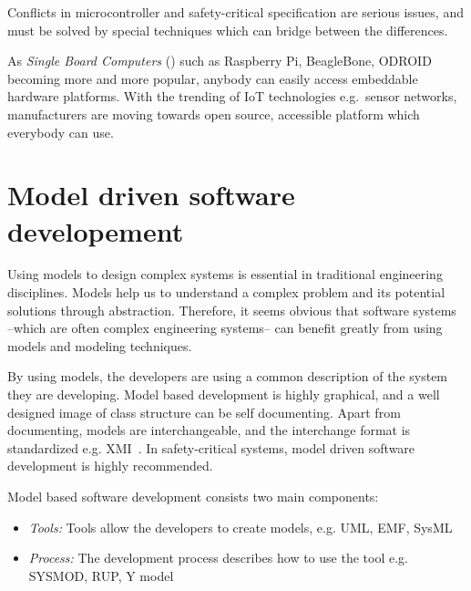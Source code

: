Conflicts in microcontroller and safety-critical specification are serious issues, and must be solved by special techniques which can bridge between the differences.

As \emph{Single Board Computers} () such as Raspberry Pi, BeagleBone, ODROID becoming more and more popular, anybody can easily access embeddable hardware platforms. With the trending of IoT technologies e.g.\ sensor networks, manufacturers are moving towards open source, accessible platform which everybody can use.

\section{Model driven software developement}

Using models to design complex systems is essential in traditional engineering disciplines. Models help us to understand a complex problem and its potential solutions through abstraction. Therefore, it seems obvious that software systems --which are often complex engineering systems-- can benefit greatly from using models and modeling techniques. \citep{pastor2008model}

By using models, the developers are using a common description of the system they are developing. Model based development is highly graphical, and a well designed image of class structure can be self documenting. Apart from documenting, models are interchangeable, and the interchange format is standardized e.g. XMI~\cite{XMI}. In safety-critical systems, model driven software development is highly recommended.

Model based software development consists two main components:
\begin{itemize}
	\item \emph{Tools:} Tools allow the developers to create models, e.g. UML, EMF, SysML
	\item \emph{Process:} The development process describes how to use the tool e.g. SYSMOD, RUP, Y model
\end{itemize}

